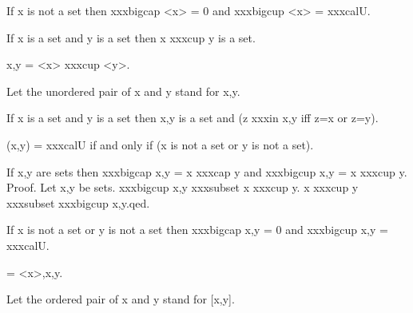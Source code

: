 \documentclass[a4paper,draft]{amsproc}
\begin{document}
{\begin{forthel}
\begin{theorem}[44b]
If x is not a set then xxxbigcap <x> = 0
and xxxbigcup <x> = xxxcal{U}.
\end{theorem}

\begin{axiom}[IV]
If x is a set and y is a set then x xxxcup y is a set.
\end{axiom}

\begin{definition}[45] {x,y} = <x> xxxcup <y>.\end{definition}
Let the unordered pair of x and y stand for {x,y}.


\begin{theorem}[46a]
If x is a set and y is a set 
then {x,y} is a set and (z xxxin {x,y} iff z=x or z=y). 
\end{theorem}

\begin{theorem}[46b]
({x,y}) = xxxcal{U} if and only if (x is not a set or y is not a set).
\end{theorem}

\begin{theorem}[47a]
If x,y are sets then xxxbigcap {x,y} = x xxxcap y
and xxxbigcup {x,y} = x xxxcup y.
Proof. Let x,y be sets.
xxxbigcup {x,y} xxxsubset x xxxcup y.
x xxxcup y xxxsubset xxxbigcup {x,y}.qed.
\end{theorem}

\begin{theorem}[47b]
If x is not a set or y is not a set then
xxxbigcap {x,y} = 0 and xxxbigcup {x,y} = xxxcal{U}.
\end{theorem}


\begin{definition}[48] [x,y] = {<x>,{x,y}}.\end{definition}
Let the ordered pair of x and y stand for [x,y].


\end{forthel}}
\end{document}
